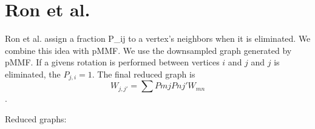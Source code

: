 \documentclass[a4paper]{article}
\begin{document}
\section{Ron et al.}

Ron et al. assign a fraction P_ij to a vertex's neighbors when it is eliminated. We combine this idea with pMMF. We use the downsampled graph generated by pMMF. If a givens rotation is performed between vertices $i$ and $j$ and $j$ is eliminated, the $P_{j, i} = 1$. The final reduced graph is $$W_{j,j'} = \sum P{mj} P{nj'} W_{mn}$$.

Reduced graphs:
\begin{figure}

\end{figure}
\end{document}
